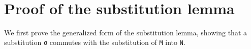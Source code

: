 \begin{fence}
\begin{code}
\<%
\\
\>[4][@{}l@{\AgdaIndent{0}}]%
\>[6]\AgdaSpace{}%
\AgdaSpace{}%
\AgdaSymbol{(}\AgdaSpace{}%
\AgdaSpace{}%
\AgdaSymbol{(}\AgdaSpace{}%
\AgdaSpace{}%
\AgdaSymbol{(}\AgdaSpace{}%
\AgdaSpace{}%
\AgdaSymbol{)))}\<%
\\
%
\>[4]\AgdaSpace{}%
\AgdaSpace{}%
\AgdaSpace{}%
\AgdaSymbol{(}\AgdaSymbol{\{}\AgdaSpace{}%
\AgdaSymbol{=}\AgdaSpace{}%
\AgdaSymbol{\}}\AgdaSpace{}%
\AgdaSpace{}%
\AgdaSymbol{(}\AgdaSymbol{\{}\AgdaSpace{}%
\AgdaSymbol{=}\AgdaSpace{}%
\AgdaSymbol{\}\{}\AgdaSpace{}%
\AgdaSymbol{=}\AgdaSpace{}%
\AgdaSymbol{\}))}\AgdaSpace{}%
\<%
\\
\>[4][@{}l@{\AgdaIndent{0}}]%
\>[6]\AgdaSpace{}%
\AgdaSpace{}%
\AgdaSymbol{(}\AgdaSpace{}%
\AgdaSpace{}%
\AgdaSymbol{)}\<%
\\
%
\>[4]\AgdaSpace{}%
\AgdaSpace{}%
\AgdaSpace{}%
\AgdaSymbol{(}\AgdaSymbol{\{}\AgdaSpace{}%
\AgdaSymbol{=}\AgdaSpace{}%
\AgdaSymbol{\})}\AgdaSpace{}%
\<%
\\
\>[4][@{}l@{\AgdaIndent{0}}]%
\>[6]\AgdaSpace{}%
\AgdaSpace{}%
\<%
\\
%
\>[4]\<%
\end{code}
\end{fence}

\hypertarget{proof-of-the-substitution-lemma}{%
\section{Proof of the substitution
lemma}\label{proof-of-the-substitution-lemma}}

We first prove the generalized form of the substitution lemma, showing
that a substitution \texttt{σ} commutes with the substitution of
\texttt{M} into \texttt{N}.

